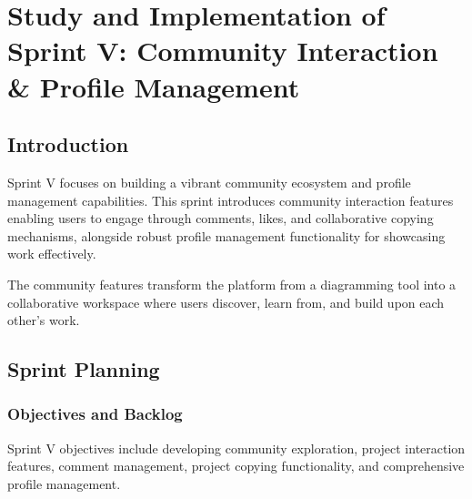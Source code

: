 \chapter[Sprint V]{Study and Implementation of Sprint V: Community Interaction \& Profile Management}

\section{Introduction}

Sprint V focuses on building a vibrant community ecosystem and profile management capabilities. This sprint introduces community interaction features enabling users to engage through comments, likes, and collaborative copying mechanisms, alongside robust profile management functionality for showcasing work effectively.

The community features transform the platform from a diagramming tool into a collaborative workspace where users discover, learn from, and build upon each other's work.

\section{Sprint Planning}

\subsection{Objectives and Backlog}

Sprint V objectives include developing community exploration, project interaction features, comment management, project copying functionality, and comprehensive profile management.

